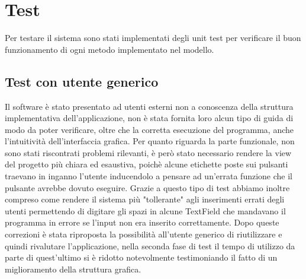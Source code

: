 \documentclass[ 4paper,11pt,openany]{book}
\begin{document}
\chapter{Test}
Per testare il sistema sono stati implementati degli unit test per verificare il buon funzionamento di ogni metodo implementato nel modello.
\section{Test con utente generico}
Il software è stato presentato ad utenti esterni non a conoscenza della struttura implementativa dell'applicazione, non è stata fornita loro alcun tipo di guida di modo da poter verificare, oltre che la corretta esecuzione del programma, anche l'intuitività dell'interfaccia grafica. Per quanto riguarda la parte funzionale, non sono stati riscontrati problemi rilevanti, è però stato necessario rendere la view del progetto più chiara ed esaustiva, poichè alcune etichette poste sui pulsanti traevano in inganno l'utente inducendolo a pensare ad un'errata funzione che il pulsante avrebbe dovuto eseguire. Grazie a questo tipo di test abbiamo inoltre compreso come rendere il sistema più "tollerante" agli inserimenti errati degli utenti permettendo di digitare gli spazi in alcune TextField che mandavano il programma in errore se l'input non era inserito correttamente. Dopo queste correzioni è stata riproposta la possibilità all'utente generico di riutilizzare e quindi rivalutare l'applicazione, nella seconda fase di test il tempo di utilizzo da parte di quest'ultimo si è ridotto notevolmente testimoniando il fatto di un miglioramento della struttura grafica.
\end{document}
